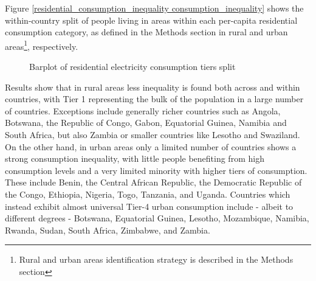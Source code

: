 \documentclass[preprint,12pt]{elsarticle}
\begin{document}
Figure \ref{residential_consumption_inequality consumption_inequality} shows the within-country split of people living in areas within each per-capita residential consumption category, as defined in the Methods section in rural and urban areas\footnote{Rural and urban areas identification strategy is described in the Methods section}, respectively.

\begin{figure}[H]
    \label{residential_consumption_inequality}
    \centering
    \qquad
    \caption{Barplot of residential electricity consumption tiers split}
\end{figure}

Results show that in rural areas less inequality is found both across and within countries, with Tier 1 representing the bulk of the population in a large number of countries. Exceptions include generally richer countries such as Angola, Botswana, the Republic of Congo, Gabon, Equatorial Guinea, Namibia and South Africa, but also Zambia  or smaller countries like Lesotho and Swaziland. On the other hand, in urban areas only a limited number of countries shows a strong consumption inequality, with little people benefiting from high consumption levels and a very limited minority with higher tiers of consumption. These include Benin, the Central African Republic, the Democratic Republic of the Congo, Ethiopia, Nigeria, Togo, Tanzania, and Uganda. Countries which instead exhibit almost universal Tier-4 urban consumption include - albeit to different degrees - Botswana, Equatorial Guinea, Lesotho, Mozambique, Namibia, Rwanda, Sudan, South Africa, Zimbabwe, and Zambia. 
\end{document}

